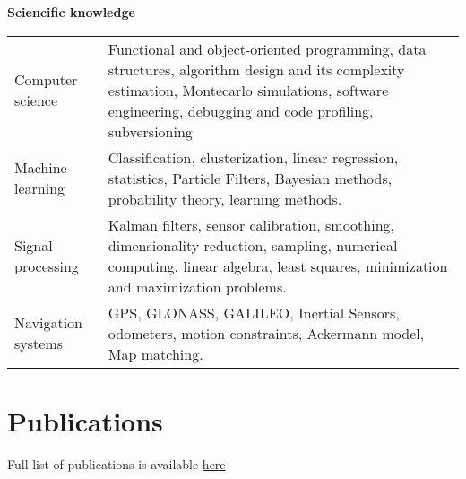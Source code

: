 \documentclass{tccv}
\begin{document}
\newpage
{\large{\textbf{Sciencific knowledge}}}

\hspace{0cm}

\begin{tabular}{ p{1.7cm} | p{6cm} }
  Computer science & Functional and object-oriented programming, data structures, algorithm design and its complexity estimation, Montecarlo simulations, software engineering, debugging and code profiling, subversioning \\
  Machine learning & Classification, clusterization, linear regression, statistics, Particle Filters, Bayesian methods, probability theory, learning methods.  \\
  Signal processing & Kalman filters, sensor calibration, smoothing, dimensionality reduction, sampling, numerical computing, linear algebra, least squares, minimization and maximization problems.  \\
  Navigation systems & GPS, GLONASS, GALILEO, Inertial Sensors, odometers, motion constraints, Ackermann model, Map matching. \\
\end{tabular}

\section{Publications}
Full list of publications is available \href{https://scholar.google.ru/citations?user=skjYlgkAAAAJ}{here}
\end{document}
